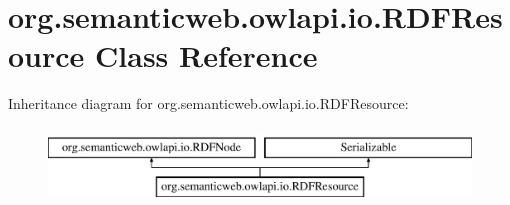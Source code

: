 \hypertarget{classorg_1_1semanticweb_1_1owlapi_1_1io_1_1_r_d_f_resource}{\section{org.\-semanticweb.\-owlapi.\-io.\-R\-D\-F\-Resource Class Reference}
\label{classorg_1_1semanticweb_1_1owlapi_1_1io_1_1_r_d_f_resource}
}
Inheritance diagram for org.\-semanticweb.\-owlapi.\-io.\-R\-D\-F\-Resource\-:\begin{figure}[H]
\begin{center}
\leavevmode
\includegraphics[height=2.000000cm]{classorg_1_1semanticweb_1_1owlapi_1_1io_1_1_r_d_f_resource}
\end{center}
\end{figure}
